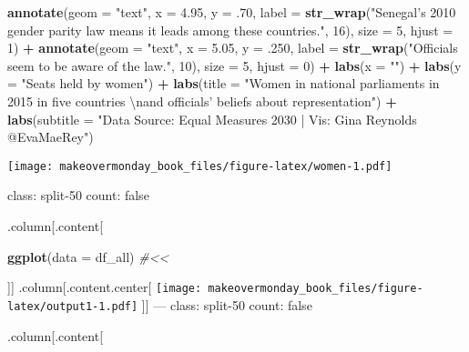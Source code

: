 \documentclass[]{book}
\newenvironment{Shaded}{\begin{snugshade}}{\end{snugshade}}
\newcommand{\KeywordTok}[1]{\textcolor[rgb]{0.13,0.29,0.53}{\textbf{#1}}}
\newcommand{\DataTypeTok}[1]{\textcolor[rgb]{0.13,0.29,0.53}{#1}}
\newcommand{\DecValTok}[1]{\textcolor[rgb]{0.00,0.00,0.81}{#1}}
\newcommand{\FloatTok}[1]{\textcolor[rgb]{0.00,0.00,0.81}{#1}}
\newcommand{\CharTok}[1]{\textcolor[rgb]{0.31,0.60,0.02}{#1}}
\newcommand{\StringTok}[1]{\textcolor[rgb]{0.31,0.60,0.02}{#1}}
\newcommand{\CommentTok}[1]{\textcolor[rgb]{0.56,0.35,0.01}{\textit{#1}}}
\newcommand{\OperatorTok}[1]{\textcolor[rgb]{0.81,0.36,0.00}{\textbf{#1}}}
\newcommand{\NormalTok}[1]{#1}
\theoremstyle{definition}
\theoremstyle{definition}
\theoremstyle{definition}
\theoremstyle{remark}
\begin{document}
\begin{Shaded}
\begin{Highlighting}[]
\StringTok{  }\KeywordTok{annotate}\NormalTok{(}\DataTypeTok{geom =} \StringTok{"text"}\NormalTok{, }\DataTypeTok{x =} \FloatTok{4.95}\NormalTok{, }\DataTypeTok{y =}\NormalTok{ .}\DecValTok{70}\NormalTok{, }\DataTypeTok{label =} \KeywordTok{str_wrap}\NormalTok{(}\StringTok{"Senegal's 2010 gender parity law means it leads among these countries."}\NormalTok{, }\DecValTok{16}\NormalTok{), }\DataTypeTok{size =} \DecValTok{5}\NormalTok{, }\DataTypeTok{hjust =} \DecValTok{1}\NormalTok{) }\OperatorTok{+}
\StringTok{  }\KeywordTok{annotate}\NormalTok{(}\DataTypeTok{geom =} \StringTok{"text"}\NormalTok{, }\DataTypeTok{x =} \FloatTok{5.05}\NormalTok{, }\DataTypeTok{y =}\NormalTok{ .}\DecValTok{250}\NormalTok{, }\DataTypeTok{label =} \KeywordTok{str_wrap}\NormalTok{(}\StringTok{"Officials seem to be aware of the law."}\NormalTok{, }\DecValTok{10}\NormalTok{), }\DataTypeTok{size =} \DecValTok{5}\NormalTok{, }\DataTypeTok{hjust =} \DecValTok{0}\NormalTok{) }\OperatorTok{+}
\StringTok{  }\KeywordTok{labs}\NormalTok{(}\DataTypeTok{x =} \StringTok{""}\NormalTok{) }\OperatorTok{+}
\StringTok{  }\KeywordTok{labs}\NormalTok{(}\DataTypeTok{y =} \StringTok{"Seats held by women"}\NormalTok{) }\OperatorTok{+}
\StringTok{  }\KeywordTok{labs}\NormalTok{(}\DataTypeTok{title =} \StringTok{"Women in national parliaments in 2015 in five countries }\CharTok{\textbackslash{}n}\StringTok{and officials' beliefs about representation"}\NormalTok{) }\OperatorTok{+}
\StringTok{  }\KeywordTok{labs}\NormalTok{(}\DataTypeTok{subtitle =} \StringTok{"Data Source: Equal Measures 2030 | Vis: Gina Reynolds @EvaMaeRey"}\NormalTok{)}
\end{Highlighting}
\end{Shaded}

\texttt{[image: makeovermonday\_book\_files/figure-latex/women-1.pdf]}

class: split-50 count: false

.column{[}.content{[}

\begin{Shaded}
\begin{Highlighting}[]
\KeywordTok{ggplot}\NormalTok{(}\DataTypeTok{data =}\NormalTok{ df_all)  }\CommentTok{#<<}
\end{Highlighting}
\end{Shaded}

{]}{]} .column{[}.content.center{[}
\texttt{[image: makeovermonday\_book\_files/figure-latex/output1-1.pdf]}
{]}{]} --- class: split-50 count: false

.column{[}.content{[}
\end{document}
